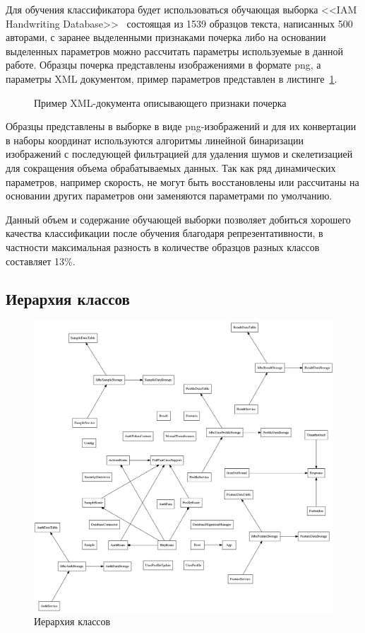 Для обучения классификатора будет использоваться обучающая выборка <<IAM Handwriting Database>>~\cite{IAM_handwriting_database} состоящая из 1539 образцов текста, написанных 500 авторами, с заранее выделенными признаками почерка либо на основании выделенных параметров можно рассчитать параметры используемые в данной работе. Образцы почерка представлены изображениями в формате png, а параметры XML документом, пример параметров представлен в листинге~\ref{listing:development:sample_set}.
\begin{figure}[h]
    \centering
    
    \caption{Пример XML-документа описывающего признаки почерка}
    \label{listing:development:sample_set}
\end{figure}

Образцы представлены в выборке в виде png-изображений и для их конвертации в наборы координат используются алгоритмы линейной бинаризации изображений с последующей фильтрацией для удаления шумов и скелетизацией для сокращения объема обрабатываемых данных. Так как ряд динамических параметров, например скорость, не могут быть восстановлены или рассчитаны на основании других параметров они заменяются параметрами по умолчанию. 

Данный объем и содержание обучающей выборки позволяет добиться хорошего качества классификации после обучения благодаря репрезентативности, в частности максимальная разность в количестве образцов разных классов составляет 13\%.

\subsection{Иерархия классов}
\begin{figure}[!ht]
    \centering
    \includegraphics[width=1\textwidth]{figures/classes-fdp.png}
    \caption{Иерархия классов}
    \label{fig:develoipment:class_fdp}
\end{figure}

